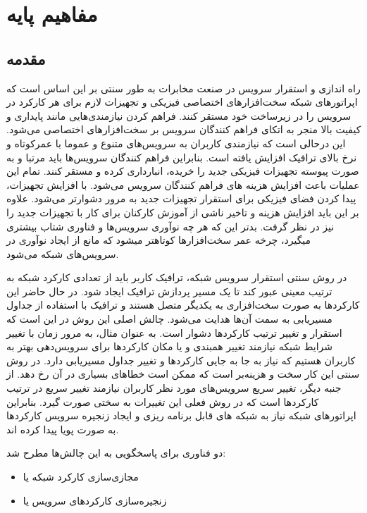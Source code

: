 \chapter{مفاهیم پایه}

\section{مقدمه}

راه اندازی و استقرار سرویس در صنعت مخابرات به طور سنتی بر این اساس است که اپراتورهای شبکه سخت‌افزارهای اختصاصی فیزیکی و تجهیزات لازم برای هر کارکرد در سرویس را در زیرساخت خود مستقر کنند.
فراهم کردن نیازمندی‌هایی مانند پایداری و کیفیت بالا منجر به اتکای فراهم کنندگان سرویس بر سخت‌افزارهای اختصاصی می‌شود. 
این درحالی است که نیازمندی کاربران به سرویس‌های متنوع و عموما با عمرکوتاه و نرخ بالای ترافیک افزایش یافته است.
بنابراین فراهم کنندگان سرویس‌ها باید مرتبا و به صورت پیوسته تجهیزات فیزیکی جدید را خریده، انبارداری کرده و مستقر کنند.
تمام این عملیات باعث افزایش هزینه های فراهم کنندگان سرویس می‌شود.
با افزایش تجهیزات، پیدا کردن فضای فیزیکی برای استقرار تجهیزات جدید به مرور دشوارتر می‌شود.
علاوه بر این باید افزایش هزینه و تاخیر ناشی از آموزش کارکنان برای کار با تجهیزات جدید را نیز در نظر گرفت.
بدتر این که هر چه نوآوری سرویس‌ها و فناوری شتاب بیشتری می‍گیرد، چرخه عمر سخت‌افزارها کوتاه‍تر می‍شود که مانع از ایجاد نوآوری در سرویس‌های شبکه می‌شود.

در روش سنتی استقرار سرویس شبکه، ترافیک کاربر باید از تعدادی کارکرد شبکه به ترتیب معینی عبور کند تا یک مسیر پردازش ترافیک ایجاد شود.
در حال حاضر این کارکردها به صورت سخت‌افزاری به یکدیگر متصل هستند و ترافیک با استفاده از جداول مسیریابی به سمت آن‌ها هدایت می‌شود.
چالش اصلی این روش در این است که استقرار و تغییر ترتیب کارکردها دشوار است.
به عنوان مثال، به مرور زمان با تغییر شرایط شبکه نیازمند تغییر همبندی و یا مکان کارکردها برای سرویس‌دهی بهتر به کاربران هستیم که نیاز به جا به جایی کارکردها و تغییر جداول مسیریابی دارد.
در روش سنتی این کار سخت و هزینه‌بر است که ممکن است خطاهای بسیاری در آن رخ دهد.
از جنبه دیگر، تغییر سریع سرویس‌های مورد نظر کاربران نیازمند تغییر سریع در ترتیب کارکردها است که در روش فعلی این تغییرات به سختی صورت گیرد.
بنابراین اپراتورهای شبکه نیاز به شبکه های قابل برنامه ریزی و ایجاد زنجیره سرویس کارکردها به صورت پویا پیدا کرده اند.

دو فناوری برای پاسخگویی به این چالش‌ها مطرح شد:

\begin{itemize}
    \item مجازی‌سازی کارکرد شبکه یا 
    \item زنجیره‌سازی کارکردهای سرویس یا 
\end{itemize}

